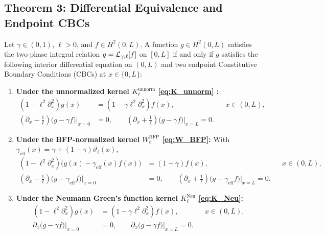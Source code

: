 \subsection{Theorem 3: Differential Equivalence and Endpoint CBCs}\label{subsec:thm3_cbc}

\begin{theorem}\label{thm:cbc}
Let $\gamma \in (0,1)$, $\ell > 0$, and $f \in H^2(0,L)$. A function $g \in H^2(0,L)$ satisfies the two-phase integral relation $g = \mathcal{L}_{\gamma,\ell}[f]$ on $[0,L]$ if and only if $g$ satisfies the following interior differential equation on $(0,L)$ and two endpoint Constitutive Boundary Conditions (CBCs) at $x \in \{0,L\}$:
\begin{enumerate}[label=(\alph*),leftmargin=*]
  \item \textbf{Under the unnormalized kernel $K_\ell^{\mathrm{unnorm}}$ \eqref{eq:K_unnorm} \cite{FernandezSaez2016,Romano2017,MikhasevNobili2020}:}
  \begin{align}
    (1 - \ell^2\partial_x^2)g(x) &= (1 - \gamma\ell^2\partial_x^2)f(x), && x \in (0,L), \label{eq:ode_unnorm}\\
    \left(\partial_x - \frac{1}{\ell}\right)\big(g - \gamma f\big)\Big|_{x=0} &= 0, \qquad
    \left(\partial_x + \frac{1}{\ell}\right)\big(g - \gamma f\big)\Big|_{x=L} = 0. \label{eq:cbc_unnorm}
  \end{align}

  \item \textbf{Under the BFP-normalized kernel $W_\ell^{\mathrm{BFP}}$ \eqref{eq:W_BFP}:} With $\gamma_{\mathrm{eff}}(x) = \gamma + (1-\gamma)\vartheta_\ell(x)$,
  \begin{align}
    (1 - \ell^2\partial_x^2)\big(g(x) - \gamma_{\mathrm{eff}}(x)f(x)\big) &= (1 - \gamma)f(x), && x \in (0,L), \label{eq:ode_bfp}\\
    \left(\partial_x - \frac{1}{\ell}\right)\big(g - \gamma_{\mathrm{eff}}f\big)\Big|_{x=0} &= 0, \qquad
    \left(\partial_x + \frac{1}{\ell}\right)\big(g - \gamma_{\mathrm{eff}}f\big)\Big|_{x=L} = 0. \label{eq:cbc_bfp}
  \end{align}

  \item \textbf{Under the Neumann Green's function kernel $K_\ell^{\mathrm{Neu}}$ \eqref{eq:K_Neu}:}
  \begin{align}
    (1 - \ell^2\partial_x^2)g(x) &= (1 - \gamma\ell^2\partial_x^2)f(x), && x \in (0,L), \label{eq:ode_neu}\\
    \partial_x\big(g - \gamma f\big)\Big|_{x=0} &= 0, \qquad
    \partial_x\big(g - \gamma f\big)\Big|_{x=L} = 0. \label{eq:cbc_neu}
  \end{align}
\end{enumerate}
\end{theorem}

